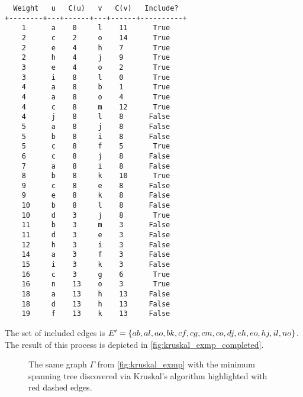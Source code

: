 \documentclass[m3380-lec-main.tex]{subfiles}
\begin{document}
\begin{exmp}
\bc
\begin{verbatim}
  Weight   u   C(u)   v   C(v)   Include?
+--------+---+------+---+------+----------+
    1      a    0     l    11      True
    2      c    2     o    14      True
    2      e    4     h    7       True
    2      h    4     j    9       True
    3      e    4     o    2       True
    3      i    8     l    0       True
    4      a    8     b    1       True
    4      a    8     o    4       True
    4      c    8     m    12      True
    4      j    8     l    8      False
    5      a    8     j    8      False
    5      b    8     i    8      False
    5      c    8     f    5       True
    6      c    8     j    8      False
    7      a    8     i    8      False
    8      b    8     k    10      True
    9      c    8     e    8      False
    9      e    8     k    8      False
    10     b    8     l    8      False
    10     d    3     j    8       True
    11     b    3     m    3      False
    11     d    3     e    3      False
    12     h    3     i    3      False
    14     a    3     f    3      False
    15     i    3     k    3      False
    16     c    3     g    6       True
    16     n    13    o    3       True
    18     a    13    h    13     False
    18     d    13    h    13     False
    19     f    13    k    13     False
\end{verbatim}
\ec
The set of included edges is $E' = \left\{ab, al, ao, bk, cf, cg, cm, co, dj, eh, eo, hj, il, no\right\}$. The result of this process is depicted in \autoref{fig:kruskal_exmp_completed}.
\end{exmp}

\begin{figure}[hbt]{\tiny
\begin{center}
\end{center}}

\caption{\label{fig:kruskal_exmp_completed} The same graph $\Gamma$ from \autoref{fig:kruskal_exmp} with the minimum spanning tree discovered via Kruskal's algorithm highlighted with red dashed edges.}
\end{figure}
\end{document}
